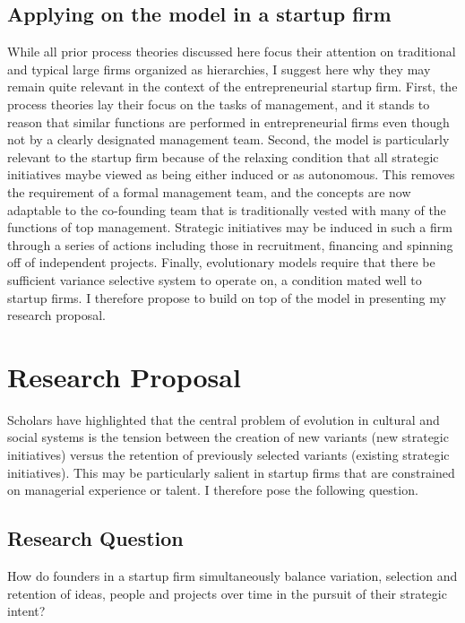 \documentclass[12pt,letterpaper]{article}
\begin{document}
\subsection{Applying on the  \cite{Lovas2000} model in a startup firm}
While all prior process theories discussed here focus their attention on traditional and typical large firms organized as hierarchies, I suggest here why they may remain quite relevant in the context of the entrepreneurial startup firm. First, the process theories lay their focus on the tasks of management, and it stands to reason that similar functions are performed in entrepreneurial firms even though not by a clearly designated management team. Second, the \cite{Lovas2000} model is particularly relevant to the startup firm because of the relaxing condition that all strategic initiatives maybe viewed as being either induced or as autonomous. This removes the requirement of a formal management team, and the concepts are now adaptable to the co-founding team that is traditionally vested with many of the functions of top management. Strategic initiatives may be induced in such a firm through a series of actions including those in recruitment,  financing and spinning off of independent projects. Finally, evolutionary models require that there be sufficient variance selective system to operate on, a condition mated well to startup firms. I therefore propose to build on top of the \cite{Lovas2000} model in presenting my research proposal.

\section{Research Proposal}
Scholars have highlighted that the central problem of evolution in cultural and social systems is the tension between the creation of new variants (new strategic initiatives) versus the retention of previously selected variants (existing strategic initiatives). This may be particularly salient in startup firms that are constrained on managerial experience or talent. I therefore pose the following question.

\subsection{Research Question}
How do founders in a startup firm simultaneously balance variation, selection and retention of ideas, people and projects over time in the pursuit of their strategic intent?
\end{document}
